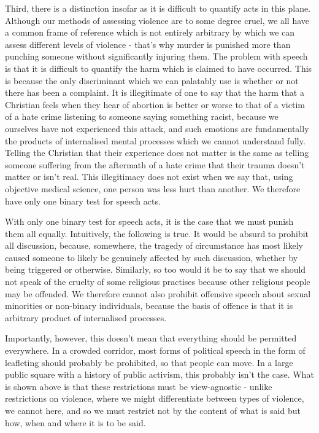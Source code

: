 Third, there is a distinction insofar as it is difficult to quantify
acts in this plane. Although our methods of assessing violence are to
some degree cruel, we all have a common frame of reference which is not
entirely arbitrary by which we can assess different levels of violence -
that's why murder is punished more than punching someone without
significantly injuring them. The problem with speech is that it is
difficult to quantify the harm which is claimed to have occurred. This
is because the only discriminant which we can palatably use is whether
or not there has been a complaint. It is illegitimate of one to say that
the harm that a Christian feels when they hear of abortion is better or
worse to that of a victim of a hate crime listening to someone saying
something racist, because we ourselves have not experienced this attack,
and such emotions are fundamentally the products of internalised mental
processes which we cannot understand fully. Telling the Christian that
their experience does not matter is the same as telling someone
suffering from the aftermath of a hate crime that their trauma doesn't
matter or isn't real. This illegitimacy does not exist when we say that,
using objective medical science, one person was less hurt than another.
We therefore have only one binary test for speech acts.

With only one binary test for speech acts, it is the case that we must
punish them all equally. Intuitively, the following is true. It would be
absurd to prohibit all discussion, because, somewhere, the tragedy of
circumstance has most likely caused someone to likely be genuinely
affected by such discussion, whether by being triggered or otherwise.
Similarly, so too would it be to say that we should not speak of the
cruelty of some religious practises because other religious people may
be offended. We therefore cannot also prohibit offensive speech about
sexual minorities or non-binary individuals, because the basis of
offence is that it is arbitrary product of internalised processes.

Importantly, however, this doesn't mean that everything should be
permitted everywhere. In a crowded corridor, most forms of political
speech in the form of leafleting should probably be prohibited, so that
people can move. In a large public square with a history of public
activism, this probably isn't the case. What is shown above is that
these restrictions must be view-agnostic - unlike restrictions on
violence, where we might differentiate between types of violence, we
cannot here, and so we must restrict not by the content of what is said
but how, when and where it is to be said.

